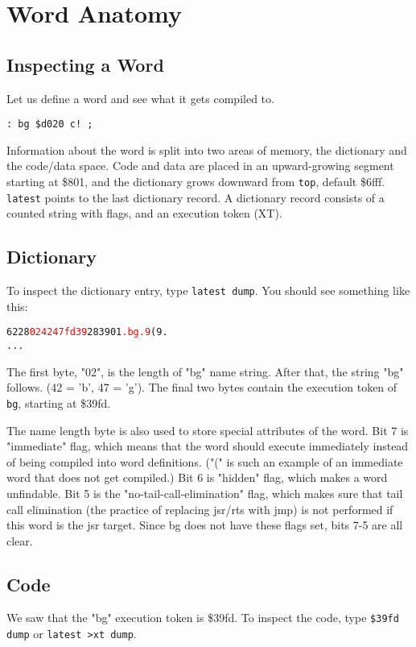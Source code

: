 \chapter{Word Anatomy}

\section{Inspecting a Word}

Let us define a word and see what it gets compiled to.

\begin{verbatim}
: bg $d020 c! ;
\end{verbatim}

Information about the word is split into two areas of memory, the dictionary and the code/data space. Code and data are placed in an upward-growing segment starting at \$801, and the dictionary grows downward from \texttt{top}, default \$6fff. \texttt{latest} points to the last dictionary record. A dictionary record consists of a counted string with flags, and an execution token (XT).

\section{Dictionary}
To inspect the dictionary entry, type \texttt{latest dump}. You should see something like this:

\begin{alltt}
6228  \textcolor{red}{02 42 47 fd 39} 28 39 01 \textcolor{red}{.bg.9}(9.
...
\end{alltt}

The first byte, "02", is the length of "bg" name string. After that, the string "bg" follows. (42 = 'b', 47 = 'g'). The final two bytes contain the execution token of \texttt{bg}, starting at \$39fd.

The name length byte is also used to store special attributes of the word. Bit 7 is "immediate" flag, which means that the word should execute immediately instead of being compiled into word definitions. ("(" is such an example of an immediate word that does not get compiled.) Bit 6 is "hidden" flag, which makes a word unfindable. Bit 5 is the "no-tail-call-elimination" flag, which makes sure that tail call elimination (the practice of replacing jsr/rts with jmp) is not performed if this word is the jsr target. Since bg does not have these flags set, bits 7-5 are all clear.

\section{Code}
We saw that the "bg" execution token is \$39fd. To inspect the code, type \texttt{\$39fd dump} or \texttt{latest >xt dump}.

